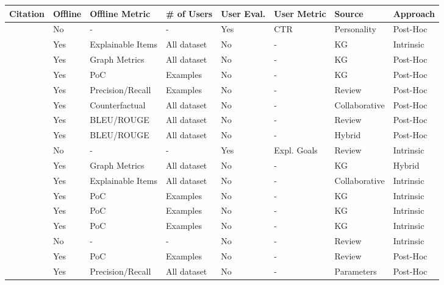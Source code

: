 \begin{xltabular}{\textwidth}{l|l|l|l|l|l|l|l}
    \toprule
    \textbf{Citation} & \textbf{Offline} & \textbf{Offline Metric} & \textbf{\# of Users} & \textbf{User Eval.} & \textbf{User Metric} & \textbf{Source} & \textbf{Approach} \\
    \midrule \midrule
    \cite{takami_flanagan_dai_ogata_2023} & No & - & - & Yes & CTR & Personality & Post-Hoc \\
    \cite{lin_zhang_lin_zeng_zhou_wu_2024} & Yes & Explainable Items & All dataset & No & - & KG & Intrinsic \\
    \cite{zanon_da_rocha_manzato_2024} & Yes & Graph Metrics & All dataset & No & - & KG & Post-Hoc \\
    \cite{samih_ghadi_fennan_2023} & Yes & PoC & Examples & No & - & KG & Post-Hoc \\
    \cite{li_liu_zhang_kou_liu_qu_2025} & Yes & Precision/Recall & Examples & No & - & Review & Post-Hoc \\
    \cite{wen_liu_jing_yu_2024} & Yes & Counterfactual & All dataset & No & - & Collaborative & Post-Hoc \\
    \cite{long_jin_2024} & Yes & BLEU/ROUGE & All dataset & No & - & Review & Post-Hoc \\
    \cite{jendal_le_lauw_lissandrini_dolog_hose_2024} & Yes & BLEU/ROUGE & All dataset & No & - & Hybrid & Post-Hoc \\
    \cite{zhong_negre_2022} & No & - & - & Yes & Expl. Goals & Review & Intrinsic \\
    \cite{alizadeh_noughabi_behkamal_zarrinkalam_kahani_2024} & Yes & Graph Metrics & All dataset & No & - & KG & Hybrid \\
    \cite{zhang_zhu_wang_2023} & Yes & Explainable Items & All dataset & No & - & Collaborative & Intrinsic \\
    \cite{zheng_chen_cao_peng_huang_2024} & Yes & PoC & Examples & No & - & KG & Intrinsic \\
    \cite{wang_xie_ding_chen_xiang_2025} & Yes & PoC & Examples & No & - & KG & Intrinsic \\
    \cite{sang_yang_zhang_liao_2025} & Yes & PoC & Examples & No & - & KG & Intrinsic \\
    \cite{9811151} & No & - & - & No & - & Review & Intrinsic \\
    \cite{8622439} & Yes & PoC & Examples & No & - & Review & Post-Hoc \\
    \cite{10741116} & Yes & Precision/Recall & All dataset & No & - & Parameters & Post-Hoc \\

\end{xltabular}
